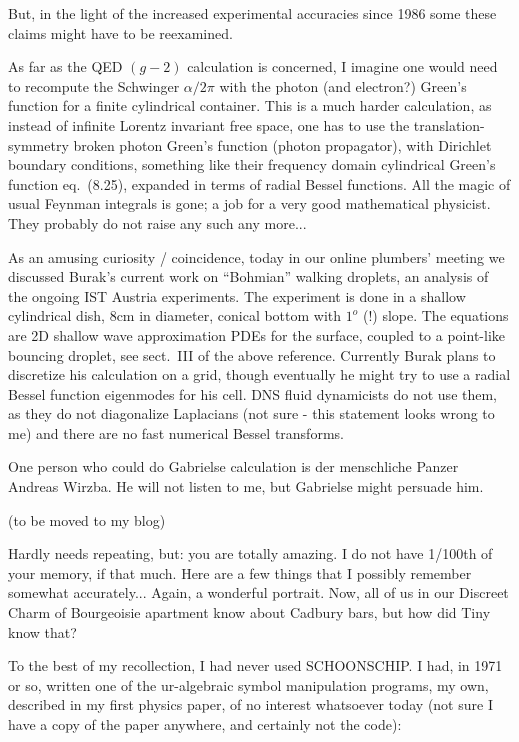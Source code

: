 \begin{description}
But, in the light of the increased experimental accuracies since 1986
some these claims might have to be reexamined.

As far as the QED $(g-2)$ calculation is concerned, I imagine one would
need to recompute the Schwinger $\alpha/2\pi$ with the photon (and
electron?) Green's function for a finite cylindrical container. This is a
much harder calculation, as instead of infinite Lorentz invariant free
space, one has to use the translation-symmetry broken photon Green's
function (photon propagator), with Dirichlet boundary conditions,
something like their frequency domain cylindrical Green's function
eq.~(8.25), expanded in terms of radial Bessel functions. All the magic
of usual Feynman integrals is gone; a job for a very good mathematical
physicist. They probably do not raise any such any more...

\item[2019-06-05 Predrag]
As an amusing curiosity / coincidence, today in our online plumbers'
meeting we discussed Burak's current work on ``Bohmian'' walking
droplets, an analysis of the ongoing IST Austria
experiments. The experiment is done in a shallow cylindrical dish, 8cm in
diameter, conical bottom with $1^o$ (!) slope. The equations are 2D
shallow wave approximation PDEs for the surface, coupled to a point-like
bouncing droplet, see sect.~III of the above reference. Currently Burak
plans to discretize his calculation on a grid, though eventually he might
try to use a radial Bessel function eigenmodes for his cell. DNS fluid
dynamicists do not use them, as they do not diagonalize Laplacians (not
sure - this statement looks wrong to me) and there are no fast numerical
Bessel transforms.

One person who could do Gabrielse calculation is der menschliche Panzer
Andreas Wirzba. He will not listen to me, but Gabrielse
might persuade him.

\item[2021-01-21 Predrag to Stephen Wolfram]
(to be moved to my
 {blog})

Hardly needs repeating, but: you are totally amazing. I do not have 1/100th of your memory, if that much. Here are a few things that I possibly remember somewhat accurately... Again, a wonderful portrait. Now, all of us in our Discreet Charm of Bourgeoisie apartment know about Cadbury bars, but how did Tiny know that?

To the best of my recollection, I had never used SCHOONSCHIP. I had, in 1971
or so, written one of the ur-algebraic symbol manipulation programs, my own,
described in my
{first physics paper}, of no interest whatsoever today (not
sure I have a copy of the paper anywhere, and certainly not the code):


\end{description}
